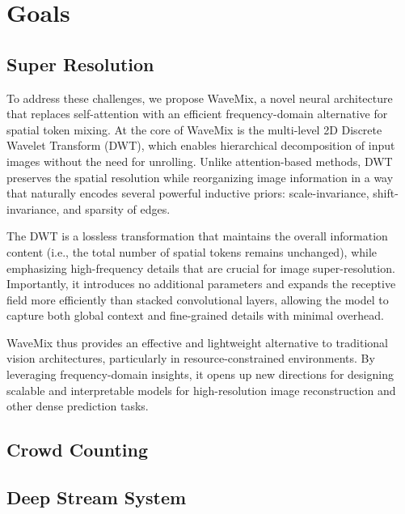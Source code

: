 \section{Goals}
\subsection{Super Resolution}
To address these challenges, we propose WaveMix, a novel neural architecture that replaces self-attention with an efficient frequency-domain alternative for spatial token mixing. At the core of WaveMix is the multi-level 2D Discrete Wavelet Transform (DWT), which enables hierarchical decomposition of input images without the need for unrolling. Unlike attention-based methods, DWT preserves the spatial resolution while reorganizing image information in a way that naturally encodes several powerful inductive priors: scale-invariance, shift-invariance, and sparsity of edges.

The DWT is a lossless transformation that maintains the overall information content (i.e., the total number of spatial tokens remains unchanged), while emphasizing high-frequency details that are crucial for image super-resolution. Importantly, it introduces no additional parameters and expands the receptive field more efficiently than stacked convolutional layers, allowing the model to capture both global context and fine-grained details with minimal overhead.

WaveMix thus provides an effective and lightweight alternative to traditional vision architectures, particularly in resource-constrained environments. By leveraging frequency-domain insights, it opens up new directions for designing scalable and interpretable models for high-resolution image reconstruction and other dense prediction tasks.

\subsection{Crowd Counting}
\subsection{Deep Stream System}